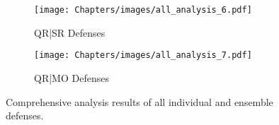 \begin{figure*}[htbp]
\begin{subfigure}[b]{0.87\textwidth}
        \centering
        \texttt{[image: Chapters/images/all\_analysis\_6.pdf]}
        \captionsetup{aboveskip=1pt} 
        \caption{QR|SR Defenses}
        \label{fig:subfig2}
    \end{subfigure}
    \vspace{0.2cm} 
    \begin{subfigure}[b]{0.87\textwidth}
        \centering
        \texttt{[image: Chapters/images/all\_analysis\_7.pdf]}
        \captionsetup{aboveskip=1pt} 
        \caption{QR|MO Defenses}
        \label{fig:subfig2}
    \end{subfigure}
    \caption{Comprehensive analysis results of all individual and ensemble defenses.}
    \label{fig:all_analysis_results}
\end{figure*}